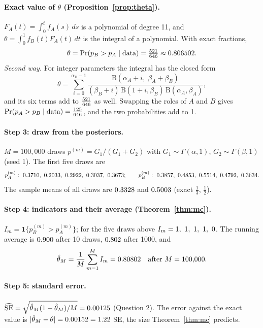 \documentclass[11pt]{article}
\theoremstyle{definition}
\theoremstyle{remark}
\renewcommand{\Pr}{\operatorname{Pr}}
\newcommand{\Bfun}{\mathrm{B}}
\newcommand{\ind}[1]{\mathbf{1}\{#1\}}
\newcommand{\data}{\text{data}}
\begin{document}
\paragraph{Exact value of $\theta$ (Proposition~\ref{prop:theta}).}
$F_A(t)=\int_0^t f_A(s)\,ds$ is a polynomial of degree 11, and $\theta=\int_0^1 f_B(t)F_A(t)\,dt$ is the integral
of a polynomial. With exact fractions,
\[
\theta=\Pr(p_B>p_A\mid\data)=\smThetaExact\approx\smThetaExactDec .
\]
\emph{Second way.} For integer parameters the integral has the closed form
\[
\theta=\sum_{i=0}^{\alpha_B-1}\frac{\Bfun(\alpha_A+i,\;\beta_A+\beta_B)}{(\beta_B+i)\,\Bfun(1+i,\beta_B)\,\Bfun(\alpha_A,\beta_A)},
\]
and its six terms add to $\tfrac{521}{646}$ as well. Swapping the roles of $A$ and $B$ gives
$\Pr(p_A>p_B\mid\data)=\smThetaSwap$, and the two probabilities add to 1.

\paragraph{Step 3: draw from the posteriors.}
$M=100{,}000$ draws $p^{(m)}=G_1/(G_1+G_2)$ with $G_1\sim\Gamma(\alpha,1)$, $G_2\sim\Gamma(\beta,1)$ (seed 1).
The first five draws are
\[
p_A^{(m)}:\ \smDrawsA;\qquad p_B^{(m)}:\ \smDrawsB .
\]
The sample means of all draws are $0.3328$ and $0.5003$ (exact $\frac13$, $\frac12$).

\paragraph{Step 4: indicators and their average (Theorem~\ref{thm:mc}).}
$I_m=\ind{p_B^{(m)}>p_A^{(m)}}$; for the five draws above $I_m=1,\ 1,\ 1,\ 1,\ 0$. The running average is $0.900$ after
10 draws, $0.802$ after 1000, and
\[
\hat\theta_M=\frac1M\sum_{m=1}^M I_m=0.80802 \quad\text{after } M=100{,}000 .
\]

\paragraph{Step 5: standard error.}
$\widehat{\mathrm{SE}}=\sqrt{\hat\theta_M(1-\hat\theta_M)/M}=0.00125$ (Question 2). The error against the exact
value is $|\hat\theta_M-\theta|=0.00152=1.22$ SE, the size Theorem~\ref{thm:mc} predicts.
\end{document}
